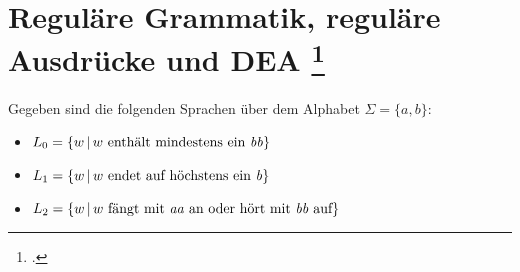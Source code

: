 \documentclass{lehramt-informatik-aufgabe}
\begin{document}
\section{Reguläre Grammatik, reguläre Ausdrücke und DEA
\footcite{theo:ab:1}}

Gegeben sind die folgenden Sprachen über dem Alphabet $\Sigma = \{a, b\}$:

\begin{itemize}
\item $L_0 = \{w \,|\, w \text{ enthält mindestens ein \emph{bb}}\}$
\item $L_1 = \{w \,|\, w \text{ endet auf höchstens ein \emph{b}}\}$
\item $L_2 = \{w \,|\, w \text{ fängt mit \emph{aa} an oder hört mit \emph{bb} auf}\}$
\end{itemize}
\end{document}
